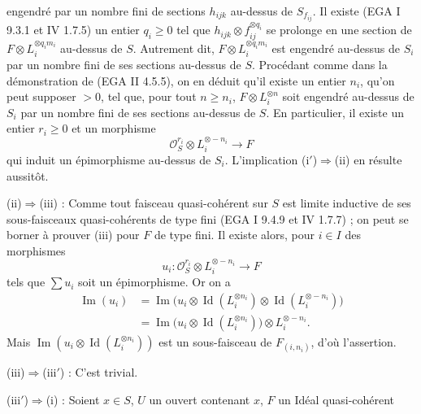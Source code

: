 engendré par un nombre fini de sections $h_{ijk}$ au-dessus de $S_{f_{ij}}$. Il existe (EGA I 9.3.1 et IV 1.7.5) un entier $q_i\ge0$ tel que $h_{ijk}\otimes f_{ij}^{\otimes q_i}$ se prolonge en une section de $F\otimes L_i^{\otimes q_im_i}$ au-dessus de $S$. Autrement dit, $F\otimes L_i^{\otimes q_im_i}$ est engendré au-dessus de $S_i$ par un nombre fini de ses sections au-dessus de $S$. Procédant comme dans la démonstration de (EGA II 4.5.5), on en déduit qu'il existe un entier $n_i$, qu'on peut supposer $>0$, tel que, pour tout $n\ge n_i$, $F\otimes L_i^{\otimes n}$ soit engendré au-dessus de $S_i$ par un nombre fini de ses sections au-dessus de $S$. En particulier, il existe un entier $r_i\ge0$ et un morphisme
\[
\mathcal O_S^{r_i}\otimes L_i^{\otimes-n_i}\longrightarrow F
\]
qui induit un épimorphisme au-dessus de $S_i$. L'implication (i$'$)$\Rightarrow$(ii) en résulte aussitôt.

(ii)$\Rightarrow$(iii) : Comme tout faisceau quasi-cohérent sur $S$ est limite inductive de ses sous-faisceaux quasi-cohérents de type fini (EGA I 9.4.9 et IV 1.7.7) ; on peut se borner à prouver (iii) pour $F$ de type fini. Il existe alors, pour $i\in I$ des morphismes
\[
u_i:\mathcal O_S^{r_i}\otimes L_i^{\otimes-n_i}\longrightarrow F
\]
tels que $\sum u_i$ soit un épimorphisme. Or on a
\[
\begin{aligned}
\operatorname{Im}(u_i)&=\operatorname{Im}\bigl(u_i\otimes\operatorname{Id}(L_i^{\otimes n_i})\otimes\operatorname{Id}(L_i^{\otimes-n_i})\bigr)\\
&=\operatorname{Im}\bigl(u_i\otimes\operatorname{Id}(L_i^{\otimes n_i})\bigr)\otimes L_i^{\otimes-n_i}.
\end{aligned}
\]
Mais $\operatorname{Im}(u_i\otimes\operatorname{Id}(L_i^{\otimes n_i}))$ est un sous-faisceau de $F_{(i,n_i)}$, d'où l'assertion.

(iii)$\Rightarrow$(iii$'$) : C'est trivial.

(iii$'$)$\Rightarrow$(i) : Soient $x\in S$, $U$ un ouvert contenant $x$, $F$ un Idéal quasi-cohérent
